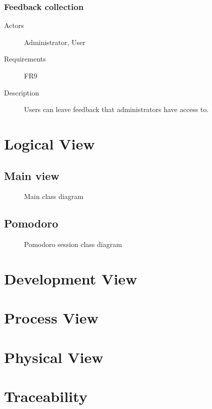 \documentclass[
    english, %
]{VUMIFPSkursinis}
\begin{document}
\subsubsection{Feedback collection}

\begin{description}
    \item[Actors] Administrator, User
    \item[Requirements] FR9
    \item[Description] Users can leave feedback that administrators have access to.
\end{description}

\section{Logical View}

\subsection{Main view}

\begin{figure}[ht]
    \centering
    
    \label{main-class-diagram}
    \caption{Main class diagram}
\end{figure}

\subsection{Pomodoro}

\begin{figure}[ht]
    \centering
    
    \label{pomodoro-session-class-diagram}
    \caption{Pomodoro session class diagram}
\end{figure}

\section{Development View}

\section{Process View}

\section{Physical View}

\section{Traceability}

\listoffigures
\printbibliography[heading=bibintoc]
\end{document}
